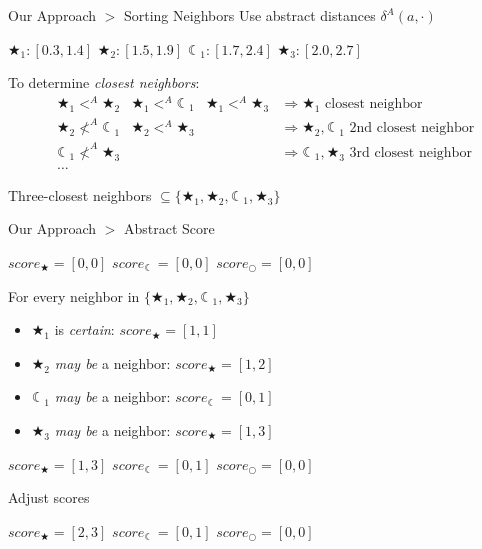 \documentclass[11pt]{beamer}
\begin{document}
\begin{frame}{Our Approach $>$ Sorting Neighbors}
Use abstract distances $\delta^A(a, \cdot)$
\begin{center}
$\bigstar_1: [0.3, 1.4]$
\hspace{1.0em}
$\bigstar_2: [1.5, 1.9]$
\hspace{1.0em}
$\leftmoon_1: [1.7, 2.4]$
\hspace{1.0em}
$\bigstar_3: [2.0, 2.7]$
\end{center}

To determine \emph{closest neighbors}:
\begin{align*}
& \bigstar_1 <^A \bigstar_2 & \bigstar_1 <^A \leftmoon_1 & \bigstar_1 <^A \bigstar_3
& \Rightarrow \bigstar_1 \text{~closest neighbor}
\\
& \bigstar_2 \not<^A \leftmoon_1 & \bigstar_2 <^A \bigstar_3 &
& \Rightarrow \bigstar_2, \leftmoon_1 \text{~2nd closest neighbor}
\\
& \leftmoon_1 \not<^A \bigstar_3 & &
&\Rightarrow \leftmoon_1, \bigstar_3 \text{~3rd closest neighbor}
\\
& \ldots & & &
\end{align*}

Three-closest neighbors $\subseteq \{\bigstar_1, \bigstar_2, \leftmoon_1, \bigstar_3\}$
\end{frame}

\begin{frame}{Our Approach $>$ Abstract Score}
\begin{center}
 $score_\bigstar = [0, 0]$
 \hspace{1.5em}
 $score_{\leftmoon} = [0, 0]$
 \hspace{1.5em}
 $score_{\bigcirc} = [0, 0]$
\end{center}

For every neighbor in $\{\bigstar_1, \bigstar_2, \leftmoon_1, \bigstar_3\}$
\begin{itemize}
 \item $\bigstar_1$ is \emph{certain}: $score_\bigstar = [1, 1]$
 \item $\bigstar_2$ \emph{may be} a neighbor: $score_\bigstar = [1, 2]$
 \item $\leftmoon_1$ \emph{may be} a neighbor: $score_{\leftmoon} = [0, 1]$
 \item $\bigstar_3$ \emph{may be} a neighbor: $score_\bigstar = [1, 3]$
\end{itemize}

\begin{center}
 $score_\bigstar = [1, 3]$
 \hspace{1.5em}
 $score_{\leftmoon} = [0, 1]$
 \hspace{1.5em}
 $score_{\bigcirc} = [0, 0]$
\end{center}

Adjust scores
\begin{center}
 $score_\bigstar = [2, 3]$
 \hspace{1.5em}
 $score_{\leftmoon} = [0, 1]$
 \hspace{1.5em}
 $score_{\bigcirc} = [0, 0]$
\end{center}
\end{frame}
\end{document}
